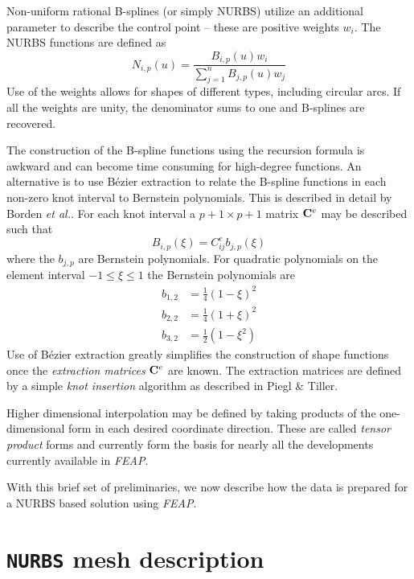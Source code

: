 Non-uniform rational B-splines (or simply NURBS) utilize an additional
parameter to describe the control point -- these are positive weights $w_i$.
The NURBS functions are defined as
\begin{displaymath}
N_{i,p}(u) = \dfrac{B_{i,p}(u) w_i}{\sum_{j=1}^n B_{j,p}(u) w_j}
\end{displaymath}
Use of the weights allows for shapes of different types, including
circular arcs.  If all the weights are unity, the denominator sums to
one and B-splines are recovered.

The construction of the B-spline functions using the recursion
formula is awkward and can become time consuming for high-degree
functions.  An alternative is to use B\'{e}zier extraction to relate
the B-spline functions in each non-zero knot interval to Bernstein
polynomials. This is described in detail by Borden \textit{et
al.}.  For each knot interval a $p+1 \times p+1$
matrix $\mathbf{C}^e$ may be described such that
\begin{displaymath}
B_{i,p}(\xi) = {C}_{ij}^e b_{j,p}(\xi) 
\end{displaymath}
where the $b_{j,p}$ are Bernstein polynomials.  For quadratic
polynomials on the element interval $-1 \le \xi \le 1$ the Bernstein
polynomials are
\begin{displaymath}
\begin{split}
b_{1,2} &= \tfrac{1}{4} ( 1 - \xi)^2 \\
b_{2,2} &= \tfrac{1}{4} ( 1 + \xi)^2 \\
b_{3,2} &= \tfrac{1}{2} ( 1 - \xi^2)
\end{split}
\end{displaymath}
Use of B\'{e}zier extraction greatly simplifies the construction of
shape functions once the \textit{extraction matrices} $\mathbf{C}^e$ are known.  
The extraction matrices are defined by a simple \textit{knot insertion}
algorithm as described in Piegl \& Tiller.

Higher dimensional interpolation may be defined by taking products of
the one-dimensional form in each desired coordinate direction.  These
are called \textit{tensor product} forms and currently form the basis
for nearly all the developments currently available in \textsl{FEAP}.

With this brief set of preliminaries, we now describe how the data is
prepared for a NURBS based solution using \textsl{FEAP}.

\chapter{\texttt{NURBS} mesh description}
\label{nmesh}

